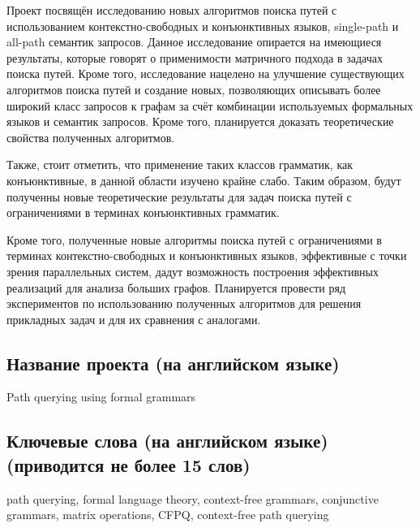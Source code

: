 \documentclass[12pt]{article}  %
\theoremstyle{remark}
\begin{document}
Проект посвящён исследованию новых алгоритмов поиска путей с использованием контекстно-свободных и конъюнктивных языков, single-path и all-path семантик запросов. Данное исследование опирается на имеющиеся результаты, которые говорят о применимости матричного подхода в задачах поиска путей. Кроме того, исследование нацелено на улучшение существующих алгоритмов поиска путей и создание новых, позволяющих описывать более широкий класс запросов к графам за счёт комбинации используемых формальных языков и семантик запросов. Кроме того, планируется доказать теоретические свойства полученных алгоритмов.

Также, стоит отметить, что применение таких классов грамматик, как конъюнктивные, в данной области   изучено крайне слабо. Таким образом, будут полученны новые теоретические результаты для задач поиска путей с ограничениями в терминах конъюнктивных грамматик.

Кроме того, полученные новые алгоритмы поиска путей с ограничениями в терминах контекстно-свободных и конъюнктивных языков, эффективные с точки зрения параллельных систем, дадут возможность построения эффективных реализаций для анализа больших графов. Планируется провести ряд экспериментов по использованию полученных алгоритмов для решения прикладных задач и для их сравнения с аналогами.

\subsection{Название проекта (на английском языке)}
Path querying using formal grammars

\subsection{Ключевые слова (на английском языке)(приводится не более 15 слов)}
path querying, formal language theory, context-free grammars, conjunctive grammars, matrix operations, CFPQ, context-free path querying
\end{document}
